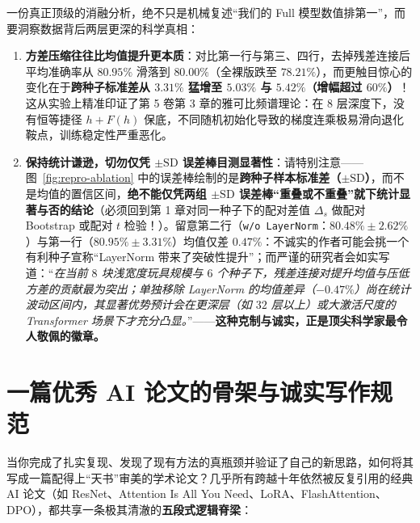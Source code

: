 一份真正顶级的消融分析，绝不只是机械复述“我们的 Full 模型数值排第一”，而要洞察数据背后两层更深的科学真相：
\begin{enumerate}
  \item \textbf{方差压缩往往比均值提升更本质}：对比第一行与第三、四行，去掉残差连接后平均准确率从 $80.95\%$ 滑落到 $80.00\%$（全裸版跌至 $78.21\%$），而更触目惊心的变化在于\textbf{跨种子标准差从 $3.31\%$ 猛增至 $5.03\%$ 与 $5.42\%$（增幅超过 $60\%$）}！这从实验上精准印证了第 5 卷第 3 章的雅可比频谱理论：在 $8$ 层深度下，没有恒等捷径 $h + F(h)$ 保底，不同随机初始化导致的梯度连乘极易滑向退化鞍点，训练稳定性严重恶化。
  \item \textbf{保持统计谦逊，切勿仅凭 $\pm\mathrm{SD}$ 误差棒目测显著性}：请特别注意——图~\ref{fig:repro-ablation} 中的误差棒绘制的是\textbf{跨种子样本标准差（$\pm\mathrm{SD}$）}，而不是均值的置信区间，\textbf{绝不能仅凭两组 $\pm\mathrm{SD}$ 误差棒“重叠或不重叠”就下统计显著与否的结论}（必须回到第 1 章对同一种子下的配对差值 $\Delta_s$ 做配对 Bootstrap 或配对 $t$ 检验！）。留意第二行（\texttt{w/o LayerNorm}：$80.48\% \pm 2.62\%$）与第一行（$80.95\% \pm 3.31\%$）均值仅差 $0.47\%$：不诚实的作者可能会挑一个有利种子宣称“LayerNorm 带来了突破性提升”；而严谨的研究者会如实写道：“\emph{在当前 $8$ 块浅宽度玩具规模与 $6$ 个种子下，残差连接对提升均值与压低方差的贡献最为突出；单独移除 LayerNorm 的均值差异（$-0.47\%$）尚在统计波动区间内，其显著优势预计会在更深层（如 $32$ 层以上）或大激活尺度的 Transformer 场景下才充分凸显。}”——\textbf{这种克制与诚实，正是顶尖科学家最令人敬佩的徽章。}
\end{enumerate}

\section{一篇优秀 AI 论文的骨架与诚实写作规范}

当你完成了扎实复现、发现了现有方法的真瓶颈并验证了自己的新思路，如何将其写成一篇配得上“天书”审美的学术论文？几乎所有跨越十年依然被反复引用的经典 AI 论文（如 ResNet、Attention Is All You Need、LoRA、FlashAttention、DPO），都共享一条极其清澈的\textbf{五段式逻辑脊梁}：

